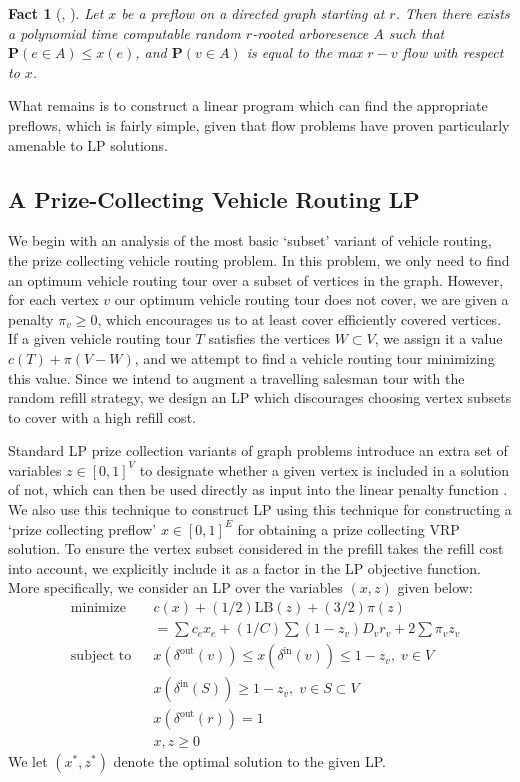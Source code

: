 \documentclass{article}
\theoremstyle{plain}
\newtheorem*{fact}{Fact}
\begin{document}
\begin{fact}[\cite{FlowToTreeResult}, \cite{FlowToTreePolyTimeResult}]
    Let $x$ be a preflow on a directed graph starting at $r$. Then there exists a polynomial time computable random $r$-rooted arboresence $A$ such that $\mathbf{P}(e \in A) \leq x(e)$, and $\mathbf{P}(v \in A)$ is equal to the max $r-v$ flow with respect to $x$.
\end{fact}

What remains is to construct a linear program which can find the appropriate preflows, which is fairly simple, given that flow problems have proven particularly amenable to LP solutions.

\subsection{A Prize-Collecting Vehicle Routing LP}

We begin with an analysis of the most basic `subset' variant of vehicle routing, the prize collecting vehicle routing problem. In this problem, we only need to find an optimum vehicle routing tour over a subset of vertices in the graph. However, for each vertex $v$ our optimum vehicle routing tour does not cover, we are given a penalty $\pi_v \geq 0$, which encourages us to at least cover efficiently covered vertices. If a given vehicle routing tour $T$ satisfies the vertices $W \subset V$, we assign it a value $c(T) + \pi(V - W)$, and we attempt to find a vehicle routing tour minimizing this value. Since we intend to augment a travelling salesman tour with the random refill strategy, we design an LP which discourages choosing vertex subsets to cover with a high refill cost.

Standard LP prize collection variants of graph problems introduce an extra set of variables $z \in [0,1]^V$ to designate whether a given vertex is included in a solution of not, which can then be used directly as input into the linear penalty function \cite{MSTLPApprox}. We also use this technique to construct LP using this technique for constructing a `prize collecting preflow' $x \in [0,1]^E$ for obtaining a prize collecting VRP solution. To ensure the vertex subset considered in the prefill takes the refill cost into account, we explicitly include it as a factor in the LP objective function. More specifically, we consider an LP over the variables $(x,z)$ given below:
%
\begin{equation*}
\begin{aligned}
& \text{minimize}
& & c(x) + (1/2) \text{LB}(z) + (3/2) \pi(z)\\
& & & = \sum c_ex_e + (1/C) \sum (1 - z_v) D_vr_v + 2\sum \pi_v z_v \\
& \text{subject to} & & x(\delta^{\text{out}}(v)) \leq x(\delta^{\text{in}}(v)) \leq 1 - z_v, \; v \in V\\
& & & x(\delta^{\text{in}}(S)) \geq 1 - z_v, \; v \in S \subset V\\
& & & x(\delta^{\text{out}}(r)) = 1\\
& & & x,z \geq 0
\end{aligned}
\end{equation*}
%
We let $(x^*,z^*)$ denote the optimal solution to the given LP.
\end{document}
